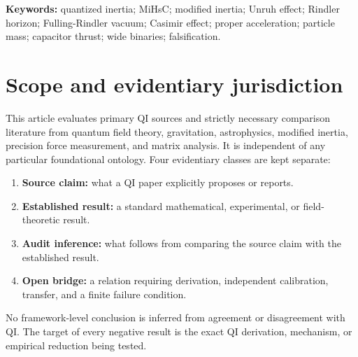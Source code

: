 \documentclass[11pt]{article}
\begin{document}
\begin{abstract}
x\sim\hbar c\), confirms the circular use of \(G\) in the proposed gravity derivation, identifies the numerical factor \(2\pi b_{\mathrm W}=1.26546\ldots\) generated by the Wien wavelength coefficient \(b_{\mathrm W}=0.201405\ldots\), proves \(\hbar/(c\lambda_{\mathrm C})=m/(2\pi)\) for the ordinary Compton wavelength, distinguishes confinement-generated composite mass from an elementary-particle theory, reconstructs the dimensional capacitor coefficient and its factor-four transit-speed convention, and converts the claimed capacitor scaling into a free-exponent factorial test. The specific QI wide-binary peak prediction is rejected by the corresponding Gaia DR3 distributional test; the broader wide-binary gravity comparison remains actively contested, with quality-controlled Newtonian-favouring samples and their published rebuttals both post-dating that rejection and neither constituting a second direct QI test. QI is concluded to be a concrete, falsifiable, but presently incomplete modified-inertia programme.
\end{abstract}

\noindent\textbf{Keywords:} quantized inertia; MiHsC; modified inertia; Unruh effect; Rindler horizon; Fulling-Rindler vacuum; Casimir effect; proper acceleration; particle mass; capacitor thrust; wide binaries; falsification.

\section*{Scope and evidentiary jurisdiction}
This article evaluates primary QI sources and strictly necessary comparison literature from quantum field theory, gravitation, astrophysics, modified inertia, precision force measurement, and matrix analysis. It is independent of any particular foundational ontology. Four evidentiary classes are kept separate:
\begin{enumerate}[leftmargin=1.55em]
  \item \textbf{Source claim:} what a QI paper explicitly proposes or reports.
  \item \textbf{Established result:} a standard mathematical, experimental, or field-theoretic result.
  \item \textbf{Audit inference:} what follows from comparing the source claim with the established result.
  \item \textbf{Open bridge:} a relation requiring derivation, independent calibration, transfer, and a finite failure condition.
\end{enumerate}
No framework-level conclusion is inferred from agreement or disagreement with QI. The target of every negative result is the exact QI derivation, mechanism, or empirical reduction being tested.
\end{document}
